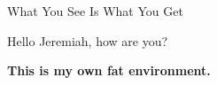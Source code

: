 \documentclass{article}
\newcommand{\wysiwyg} {What You See Is What You Get}
\newcommand{\hello}[1] {Hello #1, how are you?}
\newenvironment{fat} {\textbf\bgroup} {\egroup}
\begin{document}
\wysiwyg

\hello{Jeremiah}

\begin{fat}
This is my own fat environment.
\end{fat}
\end{document}
